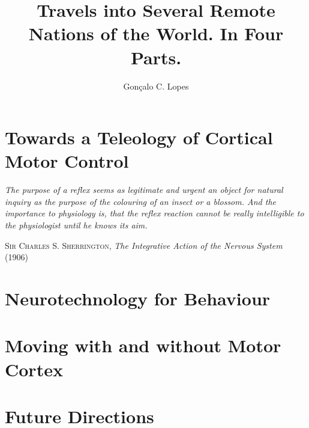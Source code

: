 \documentclass[11pt,lot,lof,b5paper]{puthesis}
\title{Travels into Several Remote Nations of the World. In Four Parts.}
\author{Gonçalo C. Lopes}
\let\originalepigraph\epigraph
\renewcommand\epigraph[2]{\originalepigraph{\textit{#1}}{#2}}
\renewcommand{\maketitlepage}{}
\begin{document}
% 
% 



\maketitlepage
\makefrontmatter



\chapter{Towards a Teleology of Cortical Motor Control}
\epigraph{The purpose of a reflex seems as legitimate and urgent an object for natural inquiry as the purpose of the colouring of an insect or a blossom. And the importance to physiology is, that the reflex reaction cannot be really intelligible to the physiologist until he knows its aim.}{\textsc{Sir Charles S. Sherrington}, \textit{The Integrative Action of the Nervous System} (1906)}


\chapter{Neurotechnology for Behaviour}


\chapter{Moving with and without Motor Cortex}


\chapter{Future Directions}


%
%


\singlespacing


\cleardoublepage
\ifdefined{}
\else

\fi




% 
% 

\end{document}
